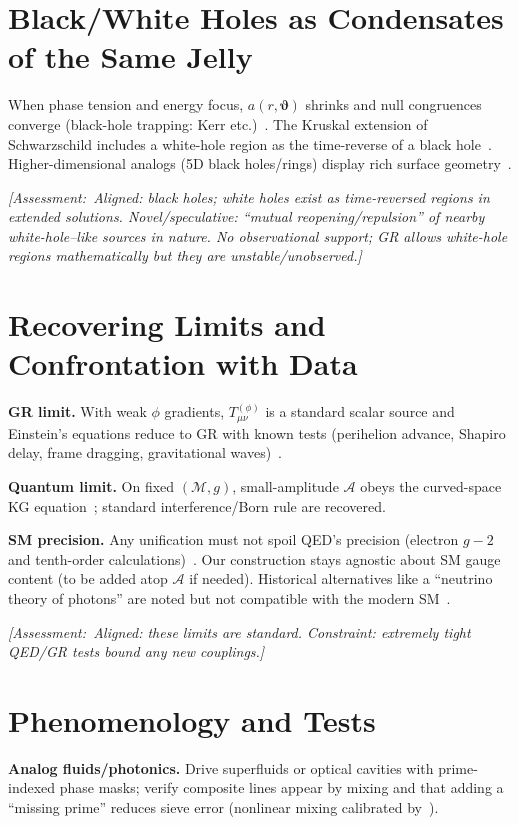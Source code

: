 \documentclass[reprint,amsmath,amssymb,aps,pra]{revtex4-2} %
\newcommand{\M}{\mathcal{M}}                   %
\newcommand{\g}{g}                             %
\newcommand{\A}{\mathcal{A}}                   %
\newcommand{\T}{T}                             %
\newcommand{\angb}{\boldsymbol{\vartheta}}     %
\newcommand{\Assessment}[1]{\par\smallskip\noindent\textit{\color{blue}[Assessment:\ #1]}\par\smallskip}
\begin{document}
\section{Black/White Holes as Condensates of the Same Jelly}
When phase tension and energy focus, $a(r,\angb)$ shrinks and null congruences converge (black-hole trapping: Kerr etc.)~\cite{Kerr1963,Kraniotis2005}. The Kruskal extension of Schwarzschild includes a white-hole region as the time-reverse of a black hole~\cite{Kruskal1960}. Higher-dimensional analogs (5D black holes/rings) display rich surface geometry~\cite{FrolovGoswami2007}.

\Assessment{Aligned: black holes; white holes exist as time-reversed regions in extended solutions. Novel/speculative: ``mutual reopening/repulsion'' of nearby white-hole–like sources in nature. No observational support; GR allows white-hole regions mathematically but they are unstable/unobserved.}

\section{Recovering Limits and Confrontation with Data}
\textbf{GR limit.} With weak $\phi$ gradients, $\T^{(\phi)}_{\mu\nu}$ is a standard scalar source and Einstein’s equations reduce to GR with known tests (perihelion advance, Shapiro delay, frame dragging, gravitational waves)~\cite{Will2014,GPB2011,LIGO2016,Kraniotis2005}.

\textbf{Quantum limit.} On fixed $(\M,\g)$, small-amplitude $\A$ obeys the curved-space KG equation~\cite{BirrellDavies,ParkerToms}; standard interference/Born rule are recovered.

\textbf{SM precision.} Any unification must not spoil QED’s precision (electron $g-2$ and tenth-order calculations)~\cite{Hanneke2008,Aoyama2012,Parker2018}. Our construction stays agnostic about SM gauge content (to be added atop $\A$ if needed). Historical alternatives like a ``neutrino theory of photons'' are noted but not compatible with the modern SM~\cite{Perkins1965,PDG2024}.

\Assessment{Aligned: these limits are standard. Constraint: extremely tight QED/GR tests bound any new couplings.}

\section{Phenomenology and Tests}
\textbf{Analog fluids/photonics.} Drive superfluids or optical cavities with prime-indexed phase masks; verify composite lines appear by mixing and that adding a ``missing prime'' reduces sieve error (nonlinear mixing calibrated by~\cite{BoydNLO}).
\end{document}
